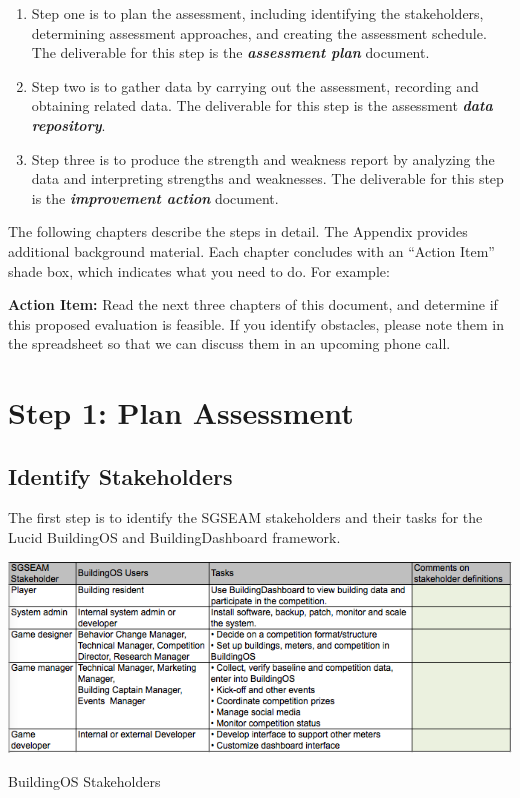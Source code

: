\documentclass[11pt,oneside]{book}
\begin{document}
\begin{enumerate}
\item Step one is to plan the assessment, including
 identifying the stakeholders, determining assessment approaches, and creating the assessment schedule. 
 The deliverable for this step is the \textbf{\textit{assessment
     plan}} document. 

\item Step two is to gather data by carrying out 
 the assessment, recording and obtaining related data. The deliverable for this step is the 
 assessment \textbf{\textit{data repository}}. 

\item Step three is to produce the strength and weakness report by analyzing 
 the data and interpreting strengths and weaknesses. The deliverable
 for this step is the \textbf{\textit{improvement action}} document.

\end{enumerate}

The following chapters describe the steps in detail. The Appendix
provides additional background material. Each chapter concludes with
an ``Action Item'' shade box, which indicates what you need to do. For
example:


\begin{shadebox}
{\bf Action Item:} Read the next three chapters of this document, and determine if this proposed
evaluation is feasible. If you identify obstacles, please note them
in the spreadsheet so that we can discuss them in an upcoming phone call.
\end{shadebox}


\chapter{Step 1: Plan Assessment}

\section{Identify Stakeholders}

The first step is to identify the SGSEAM stakeholders and their tasks
for the Lucid BuildingOS and BuildingDashboard
framework. 

\begin{table}[ht!]
  \center
  \includegraphics[width=0.9\columnwidth]{stakeholder}
  \caption{BuildingOS Stakeholders}
  \label{table:lucid-stakeholders}
\end{table}
\end{document}
